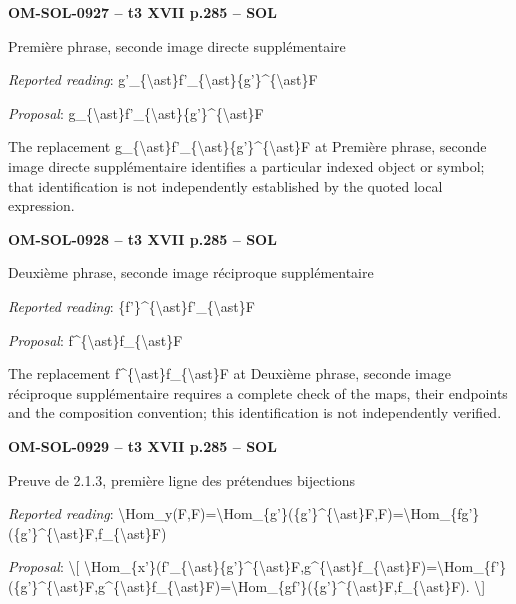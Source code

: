 \par\noindent\textbf{OM-SOL-0927 -- t3 XVII p.285 -- SOL}\par
Première phrase, seconde image directe supplémentaire\par
\emph{Reported reading}: g'\_\{\textbackslash{}ast\}f'\_\{\textbackslash{}ast\}\{g'\}\textasciicircum{}\{\textbackslash{}ast\}F\par
\emph{Proposal}: g\_\{\textbackslash{}ast\}f'\_\{\textbackslash{}ast\}\{g'\}\textasciicircum{}\{\textbackslash{}ast\}F\par
The replacement g\_\{\textbackslash{}ast\}f'\_\{\textbackslash{}ast\}\{g'\}\textasciicircum{}\{\textbackslash{}ast\}F at Première phrase, seconde image directe supplémentaire identifies a particular indexed object or symbol; that identification is not independently established by the quoted local expression.\par
\par\noindent\textbf{OM-SOL-0928 -- t3 XVII p.285 -- SOL}\par
Deuxième phrase, seconde image réciproque supplémentaire\par
\emph{Reported reading}: \{f'\}\textasciicircum{}\{\textbackslash{}ast\}f'\_\{\textbackslash{}ast\}F\par
\emph{Proposal}: f\textasciicircum{}\{\textbackslash{}ast\}f\_\{\textbackslash{}ast\}F\par
The replacement f\textasciicircum{}\{\textbackslash{}ast\}f\_\{\textbackslash{}ast\}F at Deuxième phrase, seconde image réciproque supplémentaire requires a complete check of the maps, their endpoints and the composition convention; this identification is not independently verified.\par
\par\noindent\textbf{OM-SOL-0929 -- t3 XVII p.285 -- SOL}\par
Preuve de 2.1.3, première ligne des prétendues bijections\par
\emph{Reported reading}: \textbackslash{}Hom\_y(F,F)=\allowbreak \textbackslash{}Hom\_\{g'\}(\{g'\}\textasciicircum{}\{\textbackslash{}ast\}F,F)=\allowbreak \textbackslash{}Hom\_\{fg'\}(\{g'\}\textasciicircum{}\{\textbackslash{}ast\}F,f\_\{\textbackslash{}ast\}F)\par
\emph{Proposal}: \textbackslash{}[ \textbackslash{}Hom\_\{x'\}(f'\_\{\textbackslash{}ast\}\{g'\}\textasciicircum{}\{\textbackslash{}ast\}F,g\textasciicircum{}\{\textbackslash{}ast\}f\_\{\textbackslash{}ast\}F)=\allowbreak \textbackslash{}Hom\_\{f'\}(\{g'\}\textasciicircum{}\{\textbackslash{}ast\}F,g\textasciicircum{}\{\textbackslash{}ast\}f\_\{\textbackslash{}ast\}F)=\allowbreak \textbackslash{}Hom\_\{gf'\}(\{g'\}\textasciicircum{}\{\textbackslash{}ast\}F,f\_\{\textbackslash{}ast\}F). \textbackslash{}]\par
